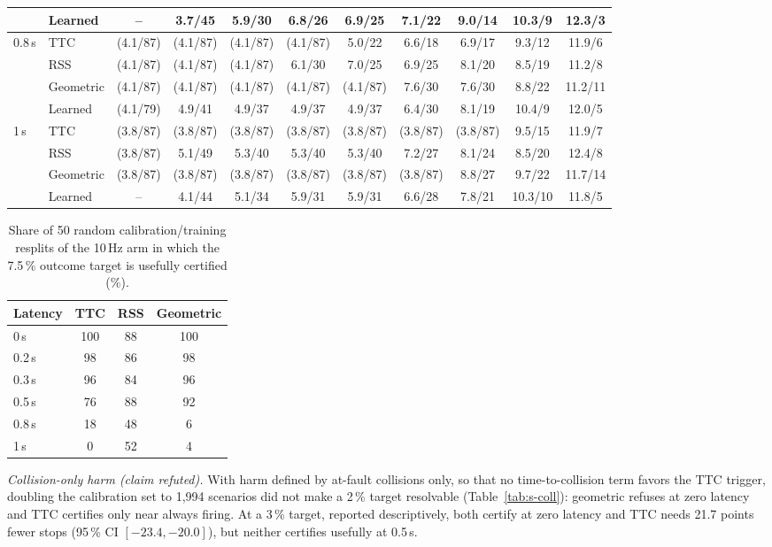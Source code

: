 \documentclass[lettersize,journal]{IEEEtran}
\begin{document}
\begin{table}[t]
\begin{tabular}{llccccccccc}
 & Learned & -- & 3.7/45 & 5.9/30 & 6.8/26 & 6.9/25 & 7.1/22 & 9.0/14 & 10.3/9 & 12.3/3 \\
\midrule
0.8\,s & TTC & (4.1/87) & (4.1/87) & (4.1/87) & (4.1/87) & 5.0/22 & 6.6/18 & 6.9/17 & 9.3/12 & 11.9/6 \\
 & RSS & (4.1/87) & (4.1/87) & (4.1/87) & 6.1/30 & 7.0/25 & 6.9/25 & 8.1/20 & 8.5/19 & 11.2/8 \\
 & Geometric & (4.1/87) & (4.1/87) & (4.1/87) & (4.1/87) & (4.1/87) & 7.6/30 & 7.6/30 & 8.8/22 & 11.2/11 \\
 & Learned & (4.1/79) & 4.9/41 & 4.9/37 & 4.9/37 & 4.9/37 & 6.4/30 & 8.1/19 & 10.4/9 & 12.0/5 \\
\midrule
1\,s & TTC & (3.8/87) & (3.8/87) & (3.8/87) & (3.8/87) & (3.8/87) & (3.8/87) & (3.8/87) & 9.5/15 & 11.9/7 \\
 & RSS & (3.8/87) & 5.1/49 & 5.3/40 & 5.3/40 & 5.3/40 & 7.2/27 & 8.1/24 & 8.5/20 & 12.4/8 \\
 & Geometric & (3.8/87) & (3.8/87) & (3.8/87) & (3.8/87) & (3.8/87) & (3.8/87) & 8.8/27 & 9.7/22 & 11.7/14 \\
 & Learned & -- & 4.1/44 & 5.1/34 & 5.9/31 & 5.9/31 & 6.6/28 & 7.8/21 & 10.3/10 & 11.8/5 \\
\bottomrule
\end{tabular}
\end{table}

\begin{table}[t]
\caption{Share of 50 random calibration/training resplits of the 10\,Hz arm in which the 7.5\,\% outcome target is usefully certified (\%).}
\label{tab:s-prob}
\centering
\scriptsize\setlength{\tabcolsep}{4pt}
\begin{tabular}{lccc}
\toprule
Latency & TTC & RSS & Geometric \\
\midrule
0\,s & 100 & 88 & 100 \\
0.2\,s & 98 & 86 & 98 \\
0.3\,s & 96 & 84 & 96 \\
0.5\,s & 76 & 88 & 92 \\
0.8\,s & 18 & 48 & 6 \\
1\,s & 0 & 52 & 4 \\
\bottomrule
\end{tabular}
\end{table}

\emph{Collision-only harm (claim refuted).} With harm defined by at-fault collisions only, so that no time-to-collision term favors the TTC trigger, doubling the calibration set to 1{,}994 scenarios did not make a 2\,\% target resolvable (Table~\ref{tab:s-coll}): geometric refuses at zero latency and TTC certifies only near always firing. At a 3\,\% target, reported descriptively, both certify at zero latency and TTC needs 21.7 points fewer stops (95\,\% CI $[-23.4, -20.0]$), but neither certifies usefully at 0.5\,s.
\end{document}
